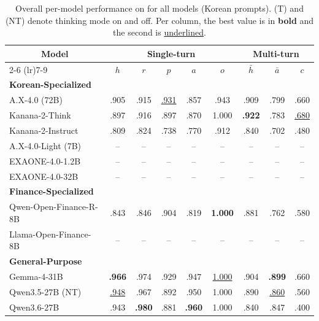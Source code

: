 \begin{table}[t]
\centering
\footnotesize
\caption{Overall per-model performance on \method{} for all models (Korean prompts). (T) and (NT) denote thinking mode on and off. Per column, the best value is in \textbf{bold} and the second is \underline{underlined}.}
\label{tab:overall}
\begin{tabular}{l ccccc ccc}
\toprule
\multicolumn{1}{c}{\multirow{2}{*}{\textbf{Model}}} & \multicolumn{5}{c}{\textbf{Single-turn}} & \multicolumn{3}{c}{\textbf{Multi-turn}} \\
\cmidrule(lr){2-6} \cmidrule(lr){7-9}
 & $h$ & $r$ & $p$ & $a$ & $o$ & $\bar{h}$ & $\bar{a}$ & $c$ \\
\midrule
\multicolumn{9}{l}{\textbf{Korean-Specialized}} \\
\addlinespace[2pt]
A.X-4.0 (72B) & .905 & .915 & \underline{.931} & .857 & .943 & .909 & .799 & .660 \\
Kanana-2-Think & .897 & .916 & .897 & .870 & 1.000 & \textbf{.922} & .783 & \underline{.680} \\
Kanana-2-Instruct & .809 & .824 & .738 & .770 & .912 & .840 & .702 & .480 \\
A.X-4.0-Light (7B) & -- & -- & -- & -- & -- & -- & -- & -- \\
EXAONE-4.0-1.2B & -- & -- & -- & -- & -- & -- & -- & -- \\
EXAONE-4.0-32B & -- & -- & -- & -- & -- & -- & -- & -- \\
\midrule
\multicolumn{9}{l}{\textbf{Finance-Specialized}} \\
\addlinespace[2pt]
Qwen-Open-Finance-R-8B & .843 & .846 & .904 & .819 & \textbf{1.000} & .881 & .762 & .580 \\
Llama-Open-Finance-8B & -- & -- & -- & -- & -- & -- & -- & -- \\
\midrule
\multicolumn{9}{l}{\textbf{General-Purpose}} \\
\addlinespace[2pt]
Gemma-4-31B & \textbf{.966} & .974 & .929 & .947 & \underline{1.000} & .904 & \textbf{.899} & .660 \\
Qwen3.5-27B (NT) & \underline{.948} & .967 & .892 & .950 & 1.000 & .890 & \underline{.860} & .560 \\
Qwen3.6-27B & .943 & \textbf{.980} & .881 & \textbf{.960} & 1.000 & .840 & .847 & .400 \\

\end{tabular}
\end{table}
